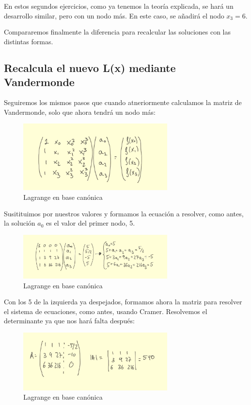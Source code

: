 \documentclass{article}
\begin{document}
En estos segundos ejercicios, como ya tenemos la teoría explicada, se hará un desarrollo similar, pero con un nodo más. En este caso, se añadirá el nodo $x_{3} = 6$.

Compararemos finalmente la diferencia para recalcular las soluciones con las distintas formas.

\subsection{Recalcula el nuevo L(x) mediante Vandermonde}

Seguiremos los mismos pasos que cuando atneriormente calculamos la matriz de Vandermonde, solo que ahora tendrá un nodo más:

\begin{figure}[h]
  \center
  \includegraphics[width=0.7\textwidth]{src/vandermonde2_1.jpg}
  \caption{Lagrange en base canónica}
\end{figure}

Susitituimos por nuestros valores y formamos la ecuación a resolver, como antes, la solución $a_{0}$ es el valor del primer nodo, 5. 

\begin{figure}[h]
  \center
  \includegraphics[width=0.7\textwidth]{src/vandermonde2_2.jpg}
  \caption{Lagrange en base canónica}
\end{figure}

Con los 5 de la izquierda ya despejados, formamos ahora la matriz para resolver el sistema de ecuaciones, como antes, usando Cramer. Resolvemos el determinante ya que nos hará falta después: 

\begin{figure}[h]
  \center
  \includegraphics[width=0.7\textwidth]{src/vandermonde2_3.jpg}
  \caption{Lagrange en base canónica}
\end{figure}
\end{document}
